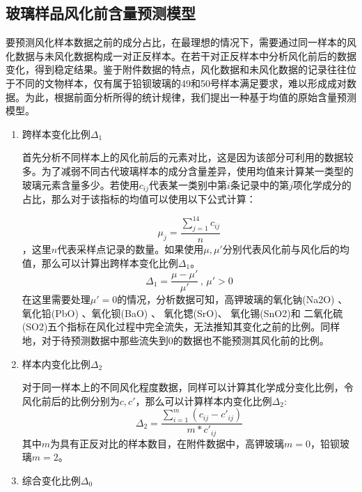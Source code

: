 \documentclass{my_paper}
\begin{document}
\subsection{玻璃样品风化前含量预测模型}
要预测风化样本数据之前的成分占比，在最理想的情况下，需要通过同一样本的风化数据与未风化数据构成一对正反样本。在若干对正反样本中分析风化前后的数据变化，得到稳定结果。鉴于附件数据的特点，风化数据和未风化数据的记录往往位于不同的文物样本，仅有属于铅钡玻璃的49和50号样本满足要求，难以形成成对数据。为此，根据前面分析所得的统计规律，我们提出一种基于均值的原始含量预测模型。

\begin{enumerate}
    \item 跨样本变化比例$\Delta_1$
    
    首先分析不同样本上的风化前后的元素对比，这是因为该部分可利用的数据较多。为了减弱不同古代玻璃样本的成分含量差异，使用均值来计算某一类型的玻璃元素含量多少。若使用$c_{ij}$代表某一类别中第$ i $条记录中的第$ j $项化学成分的占比，那么对于该指标的均值可以使用以下公式计算：
    
    \begin{equation}
    \mu_j = \frac{\sum\limits ^{14}_{j=1}c_{ij}}{n} 
    \label{mu}
    \end{equation}
    ，这里$n$代表采样点记录的数量。如果使用$\mu,\mu'$分别代表风化前与风化后的均值，那么可以计算出跨样本变化比例$\Delta_1$。
    \begin{equation}
    \Delta_1 = \frac{\mu-\mu'}{\mu'}\,,\,\mu'>0
    \label{delta1}
    \end{equation}
    在这里需要处理$ \mu'=0 $的情况，分析数据可知，高钾玻璃的氧化钠(Na2O)
    、氧化铅(PbO)
    、氧化钡(BaO)
    、
    氧化锶(SrO)、
    氧化锡(SnO2)和
    二氧化硫(SO2)五个指标在风化过程中完全流失，无法推知其变化之前的比例。同样地，对于待预测数据中那些流失到0的数据也不能预测其风化前的比例。

    \item 样本内变化比例$ \Delta_2 $
    
    对于同一样本上的不同风化程度数据，同样可以计算其化学成分变化比例，令风化前后的比例分别为$c,c'$，那么可以计算样本内变化比例$ \Delta_2 $:
    \begin{equation}
        \Delta_2 = \frac{\sum\limits_{i=1}^m (c_{ij}-c'_{ij})}{m*c'_{ij}}
    \end{equation}
    其中$ m $为具有正反对比的样本数目，在附件数据中，高钾玻璃$ m=0 $，铅钡玻璃$ m=2 $。

    \item 综合变化比例$ \Delta_0 $
    

\end{enumerate}
\end{document}
